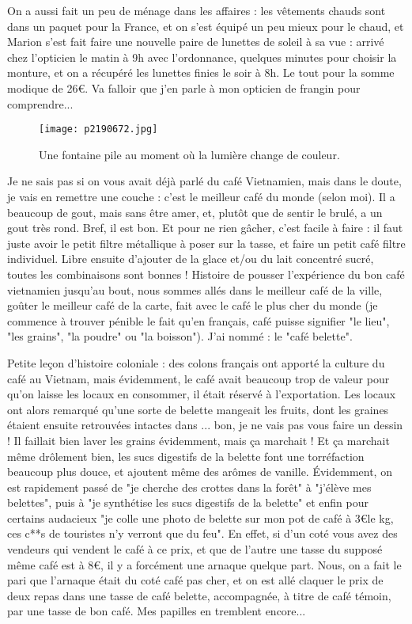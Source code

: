 \documentclass{book}
\begin{document}
On a aussi fait un peu de ménage dans les affaires : les vêtements chauds sont dans un paquet pour la France, et on s'est équipé un peu mieux pour le chaud, et Marion s'est fait faire une nouvelle paire de lunettes de soleil à sa vue : arrivé chez l'opticien le matin à 9h avec l'ordonnance, quelques minutes pour choisir la monture, et on a récupéré les lunettes finies le soir à 8h. Le tout pour la somme modique de 26\euro. Va falloir que j'en parle à mon opticien de frangin pour comprendre...




\begin{figure}[h]
\centering
\texttt{[image: p2190672.jpg]}
\caption*{Une fontaine pile au moment où la lumière change de couleur.}
\end{figure}

Je ne sais pas si on vous avait déjà parlé du café Vietnamien, mais dans le doute, je vais en remettre une couche : c'est le meilleur café du monde (selon moi). Il a beaucoup de gout, mais sans être amer, et, plutôt que de sentir le brulé, a un gout très rond. Bref, il est bon. Et pour ne rien gâcher, c'est facile à faire : il faut juste avoir le petit filtre métallique à poser sur la tasse, et faire un petit café filtre individuel. Libre ensuite d'ajouter de la glace et/ou du lait concentré sucré, toutes les combinaisons sont bonnes ! Histoire de pousser l'expérience du bon café vietnamien jusqu'au bout, nous sommes allés dans le meilleur café de la ville, goûter le meilleur café de la carte, fait avec le café le plus cher du monde (je commence à trouver pénible le fait qu'en français, café puisse signifier "le lieu", "les grains", "la poudre" ou "la boisson"). J'ai nommé : le "café belette".

Petite leçon d'histoire coloniale : des colons français ont apporté la culture du café au Vietnam, mais évidemment, le café avait beaucoup trop de valeur pour qu'on laisse les locaux en consommer, il était réservé à l'exportation. Les locaux ont alors remarqué qu'une sorte de belette mangeait les fruits, dont les graines étaient ensuite retrouvées intactes dans ... bon, je ne vais pas vous faire un dessin ! Il faillait bien laver les grains évidemment, mais ça marchait ! Et ça marchait même drôlement bien, les sucs digestifs de la belette font une torréfaction beaucoup plus douce, et ajoutent même des arômes de vanille. Évidemment, on est rapidement passé de "je cherche des crottes dans la forêt" à "j'élève mes belettes", puis à "je synthétise les sucs digestifs de la belette" et enfin pour certains audacieux "je colle une photo de belette sur mon pot de café à 3\euro le kg, ces c**s de touristes n'y verront que du feu". En effet, si d'un coté vous avez des vendeurs qui vendent le café à ce prix, et que de l'autre une tasse du supposé même café est à 8\euro, il y a forcément une arnaque quelque part. Nous, on a fait le pari que l'arnaque était du coté café pas cher, et on est allé claquer le prix de deux repas dans une tasse de café belette, accompagnée, à titre de café témoin, par une tasse de bon café. Mes papilles en tremblent encore...
\end{document}

